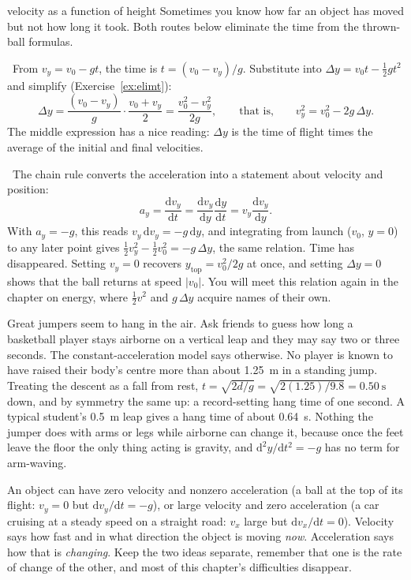 \documentclass[11pt,twoside,openany]{book}
\newcommand{\dd}{\mathrm{d}}
\newcommand{\deriv}[2]{\frac{\dd #1}{\dd #2}}
\newcommand{\viewtag}[3]{\fcolorbox{#2}{#3}{\footnotesize\textbf{\textcolor{#2}{#1}}}}
\newcommand{\elemtag}{\viewtag{Elementary}{elemcol}{elempale}}
\newcommand{\calctag}{\viewtag{Calculus}{calccol}{calcpale}}
\newcommand{\elem}{\par\medskip\noindent\elemtag\ }
\newcommand{\calc}{\par\medskip\noindent\calctag\ }
\begin{document}
\begin{twoviews}{velocity as a function of height}
Sometimes you know how far an object has moved but not how long it took. Both routes below eliminate the time from the thrown-ball formulas.

\elem From $v_y = v_0 - gt$, the time is $t = (v_0 - v_y)/g$. Substitute into $\Delta y = v_0 t - \tfrac12 g t^2$ and simplify (Exercise~\ref{ex:elimt}):
\[
\Delta y = \frac{(v_0 - v_y)}{g}\cdot\frac{v_0 + v_y}{2} = \frac{v_0^2 - v_y^2}{2g},
\qquad\text{that is,}\qquad v_y^2 = v_0^2 - 2g\,\Delta y.
\]
The middle expression has a nice reading: $\Delta y$ is the time of flight times the average of the initial and final velocities.

\calc The chain rule converts the acceleration into a statement about velocity and position:
\[
a_y = \deriv{v_y}{t} = \deriv{v_y}{y}\deriv{y}{t} = v_y\deriv{v_y}{y}.
\]
With $a_y = -g$, this reads $v_y\,\dd v_y = -g\,\dd y$, and integrating from launch ($v_0$, $y = 0$) to any later point gives $\tfrac12 v_y^2 - \tfrac12 v_0^2 = -g\,\Delta y$, the same relation. Time has disappeared. Setting $v_y = 0$ recovers $y_{\text{top}} = v_0^2/2g$ at once, and setting $\Delta y = 0$ shows that the ball returns at speed $|v_0|$. You will meet this relation again in the chapter on energy, where $\tfrac12 v^2$ and $g\,\Delta y$ acquire names of their own.
\end{twoviews}

\begin{modelnote}
Great jumpers seem to hang in the air. Ask friends to guess how long a basketball player stays airborne on a vertical leap and they may say two or three seconds. The constant-acceleration model says otherwise. No player is known to have raised their body's centre more than about \SI{1.25}{\metre} in a standing jump. Treating the descent as a fall from rest, $t = \sqrt{2d/g} = \sqrt{2(1.25)/9.8} = \SI{0.50}{\second}$ down, and by symmetry the same up: a record-setting hang time of one second. A typical student's \SI{0.5}{\metre} leap gives a hang time of about \SI{0.64}{\second}. Nothing the jumper does with arms or legs while airborne can change it, because once the feet leave the floor the only thing acting is gravity, and $\dd^2 y/\dd t^2 = -g$ has no term for arm-waving.
\end{modelnote}

\begin{keyidea}
An object can have zero velocity and nonzero acceleration (a ball at the top of its flight: $v_y = 0$ but $\dd v_y/\dd t = -g$), or large velocity and zero acceleration (a car cruising at a steady speed on a straight road: $v_x$ large but $\dd v_x/\dd t = 0$). Velocity says how fast and in what direction the object is moving \emph{now}. Acceleration says how that is \emph{changing}. Keep the two ideas separate, remember that one is the rate of change of the other, and most of this chapter's difficulties disappear.
\end{keyidea}
\end{document}
